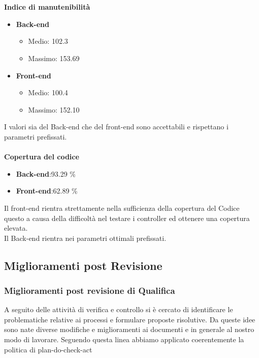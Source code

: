 \\\\
\textbf{Indice di manutenibilità}
\begin{itemize}
\item \textbf{Back-end}
\begin{itemize}
\item Medio: 102.3
\item Massimo: 153.69
\end{itemize}
\item \textbf{Front-end}
\begin{itemize}
\item Medio: 100.4
\item Massimo: 152.10
\end{itemize}
\end{itemize}
I valori sia del Back-end che del front-end sono accettabili e rispettano i parametri prefissati.
\\\\
\textbf{Copertura del codice}
\begin{itemize}
\item \textbf{Back-end}:93.29 \%
\item \textbf{Front-end}:62.89 \%
\end{itemize}
Il front-end rientra strettamente nella sufficienza della copertura del Codice questo a causa della difficoltà nel testare i controller ed ottenere una copertura elevata.\\
Il Back-end rientra nei parametri ottimali prefissati.

\subsection{Miglioramenti post Revisione}
\subsubsection{Miglioramenti post revisione di Qualifica}
A seguito delle attività di verifica e controllo si è cercato di identificare le problematiche relative ai processi e formulare proposte risolutive. Da queste idee sono nate diverse modifiche e miglioramenti ai
documenti e in generale al nostro modo di lavorare. Seguendo questa linea abbiamo applicato
coerentemente la politica di plan-do-check-act

